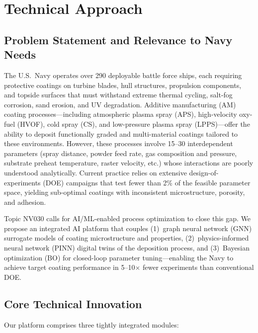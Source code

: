 \documentclass[11pt,letterpaper]{article}
\begin{document}
\newpage

\section{Technical Approach}
\label{sec:technical_approach}

\subsection{Problem Statement and Relevance to Navy Needs}

The U.S.\ Navy operates over 290 deployable battle force ships, each
requiring protective coatings on turbine blades, hull structures,
propulsion components, and topside surfaces that must withstand extreme
thermal cycling, salt-fog corrosion, sand erosion, and UV degradation.
Additive manufacturing (AM) coating processes---including atmospheric
plasma spray (APS), high-velocity oxy-fuel (HVOF), cold spray (CS), and
low-pressure plasma spray (LPPS)---offer the ability to deposit
functionally graded and multi-material coatings tailored to these
environments. However, these processes involve 15--30 interdependent
parameters (spray distance, powder feed rate, gas composition and
pressure, substrate preheat temperature, raster velocity, etc.) whose
interactions are poorly understood analytically. Current practice relies
on extensive design-of-experiments (DOE) campaigns that test fewer than
2\% of the feasible parameter space, yielding sub-optimal coatings with
inconsistent microstructure, porosity, and adhesion.

Topic NV030 calls for AI/ML-enabled process optimization to close this
gap. We propose an integrated AI platform that couples (1)~graph neural
network (GNN) surrogate models of coating microstructure and properties,
(2)~physics-informed neural network (PINN) digital twins of the
deposition process, and (3)~Bayesian optimization (BO) for closed-loop
parameter tuning---enabling the Navy to achieve target coating
performance in 5--10$\times$ fewer experiments than conventional DOE.

\subsection{Core Technical Innovation}

Our platform comprises three tightly integrated modules:
\end{document}
